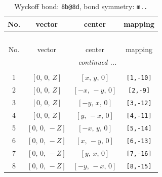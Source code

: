 \documentclass[fleqn,8pt]{jsarticle}
\begin{document}
\begin{longtable}{cccc}
\caption{Wyckoff bond: {\tt 8b@8d}, bond symmetry: {\tt m..}}
 \\
 \hline \hline
No. & vector & center & mapping \\ \hline \endfirsthead

\multicolumn{3}{l}{\tablename\ \thetable{}} \\
 \hline \hline
No. & vector & center & mapping \\ \hline \endhead

 \hline \hline
\multicolumn{3}{r}{\footnotesize\it continued ...} \\ \endfoot

 \hline \hline
\multicolumn{3}{r}{} \\ \endlastfoot

1 & $\left[ 0,\, 0,\, Z \right]$ & $\left[ x,\, y,\, 0 \right]$ & {\tt [1,-10]} \\ \hline
2 & $\left[ 0,\, 0,\, Z \right]$ & $\left[ - x,\, - y,\, 0 \right]$ & {\tt [2,-9]} \\ \hline
3 & $\left[ 0,\, 0,\, Z \right]$ & $\left[ - y,\, x,\, 0 \right]$ & {\tt [3,-12]} \\ \hline
4 & $\left[ 0,\, 0,\, Z \right]$ & $\left[ y,\, - x,\, 0 \right]$ & {\tt [4,-11]} \\ \hline
5 & $\left[ 0,\, 0,\, - Z \right]$ & $\left[ - x,\, y,\, 0 \right]$ & {\tt [5,-14]} \\ \hline
6 & $\left[ 0,\, 0,\, - Z \right]$ & $\left[ x,\, - y,\, 0 \right]$ & {\tt [6,-13]} \\ \hline
7 & $\left[ 0,\, 0,\, - Z \right]$ & $\left[ y,\, x,\, 0 \right]$ & {\tt [7,-16]} \\ \hline
8 & $\left[ 0,\, 0,\, - Z \right]$ & $\left[ - y,\, - x,\, 0 \right]$ & {\tt [8,-15]} \\
\end{longtable}
\renewcommand{\arraystretch}{1.2}
\end{document}

